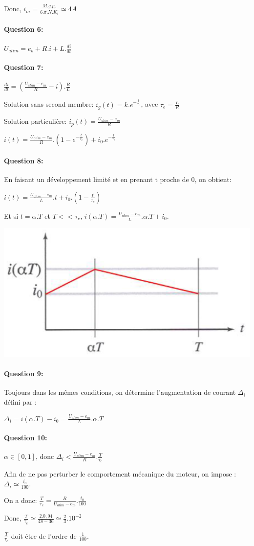 Donc, $i_m=\frac{M.g.p_v}{6.\pi.N.K_i}\simeq 4A$

\paragraph{Question 6:}

$U_{alim}=e_b+R.i+L.\frac{di}{dt}$

\paragraph{Question 7:}

$\frac{di}{dt}=(\frac{U_{alim}-e_m}{R}-i).\frac{R}{L}$

Solution sans second membre: $i_g(t)=k.e^{-\frac{t}{\tau_e}}$, avec $\tau_e=\frac{L}{R}$

Solution particulière: $i_p(t)=\frac{U_{alim}-e_m}{R}$

$i(t)=\frac{U_{alim}-e_m}{R}.(1-e^{-\frac{t}{\tau_e}})+i_0.e^{-\frac{t}{\tau_e}}$

\paragraph{Question 8:}

En faisant un développement limité et en prenant t proche de 0, on obtient:

$i(t)=\frac{U_{alim}-e_m}{L}.t+i_0.(1-\frac{t}{\tau_e})$

Et si $t=\alpha.T$ et $T<<\tau_e$, $i(\alpha.T)=\frac{U_{alim}-e_m}{L}.\alpha.T+i_0$.

\begin{center}
 \includegraphics[width=0.3\linewidth]{img/td02_17}
\end{center}

\paragraph{Question 9:}

Toujours dans les mêmes conditions, on détermine l'augmentation de courant $\Delta_i$ défini par :

$\Delta_i=i(\alpha.T)-i_0=\frac{U_{alim}-e_m}{L}.\alpha.T$

\paragraph{Question 10:}

$\alpha \in [0,1]$, donc $\Delta_i<\frac{U_{alim}-e_m}{R}.\frac{T}{\tau_e}$

Afin de ne pas perturber le comportement mécanique du moteur, on impose : $\Delta_i\simeq\frac{i_0}{100}$.

On a donc: $\frac{T}{\tau_e}=\frac{R}{U_{alim}-e_m}.\frac{i_0}{100}$

Donc, $\frac{T}{\tau_e}\simeq\frac{2.0,04}{48-36}\simeq\frac{2}{3}.10^{-2}$

$\frac{T}{\tau_e}$ doit être de l'ordre de $\frac{1}{100}$.


